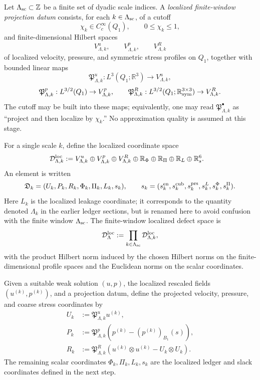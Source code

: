 \documentclass[11pt]{article}
\numberwithin{equation}{section}
\newcommand{\R}{\mathbb R}
\begin{document}
Let \(\Lambda_{\rm sc}\subset\mathbb Z\) be a finite set of dyadic scale
indices.  A \emph{localized finite-window projection datum} consists, for
each \(k\in\Lambda_{\rm sc}\), of a cutoff
\[
        \chi_k\in C_c^\infty(Q_1),
        \qquad 0\leq \chi_k\leq1,
\]
and finite-dimensional Hilbert spaces
\[
        V_{\Lambda,k}^u,\qquad
        V_{\Lambda,k}^p,\qquad
        V_{\Lambda,k}^R
\]
of localized velocity, pressure, and symmetric stress profiles on \(Q_1\),
together with bounded linear maps
\[
        \mathfrak P_{\Lambda,k}^u:L^3(Q_1;\R^3)\to V_{\Lambda,k}^u,
\]
\[
        \mathfrak P_{\Lambda,k}^p:L^{3/2}(Q_1)\to V_{\Lambda,k}^p,
        \qquad
        \mathfrak P_{\Lambda,k}^R:
        L^{3/2}(Q_1;\R_{\rm sym}^{3\times3})
        \to V_{\Lambda,k}^R .
\]
The cutoff may be built into these maps; equivalently, one may read
\(\mathfrak P_{\Lambda,k}^\bullet\) as ``project and then localize by
\(\chi_k\).''  No approximation quality is assumed at this stage.

For a single scale \(k\), define the localized coordinate space
\[
\begin{aligned}
        \mathcal D_{\Lambda,k}^{\rm loc}
        &:=
        V_{\Lambda,k}^u
        \oplus
        V_{\Lambda,k}^p
        \oplus
        V_{\Lambda,k}^R
        \oplus
        \R_\Phi
        \oplus
        \R_\Pi
        \oplus
        \R_L
        \oplus
        \R^6_s .
\end{aligned}
\]
An element is written
\[
        \mathfrak D_k
        =
        (U_k,P_k,R_k,\Phi_k,\Pi_k,L_k,s_k),
        \qquad
        s_k=(s_k^{\rm en},s_k^{\rm cub},s_k^{\rm prs},
        s_k^L,s_k^\Phi,s_k^\Pi).
\]
Here \(L_k\) is the localized leakage coordinate; it corresponds to the
quantity denoted \(\Lambda_k\) in the earlier ledger sections, but is
renamed here to avoid confusion with the finite window
\(\Lambda_{\rm sc}\).  The finite-window localized defect space is
\[
        \mathcal D_\Lambda^{\rm loc}
        :=
        \prod_{k\in\Lambda_{\rm sc}}
        \mathcal D_{\Lambda,k}^{\rm loc},
\]
with the product Hilbert norm induced by the chosen Hilbert norms on the
finite-dimensional profile spaces and the Euclidean norms on the scalar
coordinates.

Given a suitable weak solution \((u,p)\), the localized rescaled fields
\((u^{(k)},p^{(k)})\), and a projection datum, define the projected
velocity, pressure, and coarse stress coordinates by
\begin{align}
        U_k
        &:=
        \mathfrak P_{\Lambda,k}^u u^{(k)},\label{eq:loc-U-coordinate}\\
        P_k
        &:=
        \mathfrak P_{\Lambda,k}^p
        \left(
        p^{(k)}-(p^{(k)})_{B_1}(s)
        \right),\label{eq:loc-P-coordinate}\\
        R_k
        &:=
        \mathfrak P_{\Lambda,k}^R
        \left(
        u^{(k)}\otimes u^{(k)}
        -
        U_k\otimes U_k
        \right).\label{eq:loc-R-coordinate}
\end{align}
The remaining scalar coordinates \(\Phi_k,\Pi_k,L_k,s_k\) are the
localized ledger and slack coordinates defined in the next step.
\end{document}
